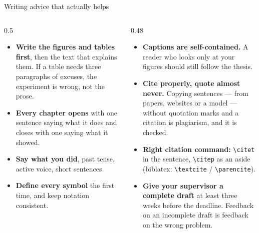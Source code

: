 \documentclass[aspectratio=169,11pt]{beamer}
\newcommand{\code}[1]{\texttt{\small #1}}
\newcommand{\key}[1]{\textbf{\color{brand}#1}}
\begin{document}
\begin{frame}{Writing advice that actually helps}
\begin{columns}[T]
\begin{column}{0.5\textwidth}
\footnotesize
\begin{itemize}
  \item \key{Write the figures and tables first}, then the text that explains
        them. If a table needs three paragraphs of excuses, the experiment is
        wrong, not the prose.
  \item \key{Every chapter opens} with one sentence saying what it does and
        closes with one saying what it showed.
  \item \key{Say what you did}, past tense, active voice, short sentences.
  \item \key{Define every symbol} the first time, and keep notation consistent.
\end{itemize}
\end{column}
\begin{column}{0.48\textwidth}
\footnotesize
\begin{itemize}
  \item \key{Captions are self-contained.} A reader who looks only at your
        figures should still follow the thesis.
  \item \key{Cite properly, quote almost never.} Copying sentences --- from
        papers, websites or a model --- without quotation marks and a citation
        is plagiarism, and it is checked.
  \item \key{Right citation command:} \code{\textbackslash citet} in the
        sentence, \code{\textbackslash citep} as an aside (biblatex:
        \code{\textbackslash textcite} / \code{\textbackslash parencite}).
  \item \key{Give your supervisor a complete draft} at least three weeks before
        the deadline. Feedback on an incomplete draft is feedback on the wrong
        problem.
\end{itemize}
\end{column}
\end{columns}
\end{frame}
\end{document}
